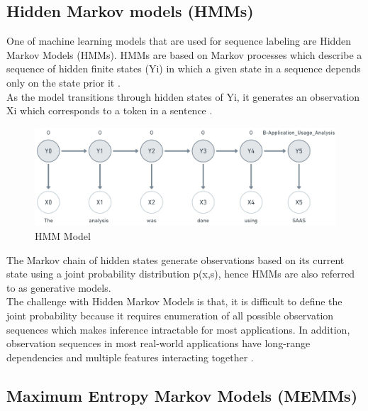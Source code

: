 \subsection{Hidden Markov models (HMMs)}
\label{sec:chapter05:MLModels:HMMS}

One of machine learning models that are used for sequence labeling are Hidden Markov Models (HMMs). HMMs are based on Markov processes which describe a sequence of hidden finite states (Yi) in which a given state in a sequence depends only on the state prior it \citep{enwiki:1071684499, enwiki:1068802172}. \\

As the model transitions through hidden states of Yi, it generates an observation Xi which corresponds to a token in a sentence \citep{aggarwal2018machine}.

\begin{figure}[htbp]
	\centering
	\includegraphics[width=1\textwidth]{4.graphics/figures/ch_5/HMM}
	\caption{HMM Model}
	\label{fig:chapter03:setup}
\end{figure}

The Markov chain of hidden states generate observations based on its current state using a joint probability distribution p(x,s), hence HMMs are also referred to as generative models. \\

The challenge with Hidden Markov Models is that, it is difficult to define the joint probability because it requires enumeration of all possible observation sequences which makes inference intractable for most applications. In addition, observation sequences in most real-world applications have long-range dependencies and multiple features interacting together \citep{bulla2006application, wallach2004conditional}.
 
\subsection{Maximum Entropy Markov Models (MEMMs)}
\label{sec:chapter05:MLModels:MEMMs}

